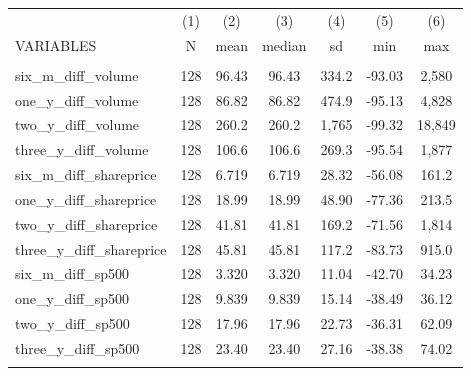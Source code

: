 \begin{tabular}{lcccccc} \hline
 & (1) & (2) & (3) & (4) & (5) & (6) \\
VARIABLES & N & mean & median & sd & min & max \\ \hline
 &  &  &  &  &  &  \\
six\_m\_diff\_volume & 128 & 96.43 & 96.43 & 334.2 & -93.03 & 2,580 \\
one\_y\_diff\_volume & 128 & 86.82 & 86.82 & 474.9 & -95.13 & 4,828 \\
two\_y\_diff\_volume & 128 & 260.2 & 260.2 & 1,765 & -99.32 & 18,849 \\
three\_y\_diff\_volume & 128 & 106.6 & 106.6 & 269.3 & -95.54 & 1,877 \\
six\_m\_diff\_shareprice & 128 & 6.719 & 6.719 & 28.32 & -56.08 & 161.2 \\
one\_y\_diff\_shareprice & 128 & 18.99 & 18.99 & 48.90 & -77.36 & 213.5 \\
two\_y\_diff\_shareprice & 128 & 41.81 & 41.81 & 169.2 & -71.56 & 1,814 \\
three\_y\_diff\_shareprice & 128 & 45.81 & 45.81 & 117.2 & -83.73 & 915.0 \\
six\_m\_diff\_sp500 & 128 & 3.320 & 3.320 & 11.04 & -42.70 & 34.23 \\
one\_y\_diff\_sp500 & 128 & 9.839 & 9.839 & 15.14 & -38.49 & 36.12 \\
two\_y\_diff\_sp500 & 128 & 17.96 & 17.96 & 22.73 & -36.31 & 62.09 \\
three\_y\_diff\_sp500 & 128 & 23.40 & 23.40 & 27.16 & -38.38 & 74.02 \\
 &  &  &  &  &  &  \\ \hline
\end{tabular}
